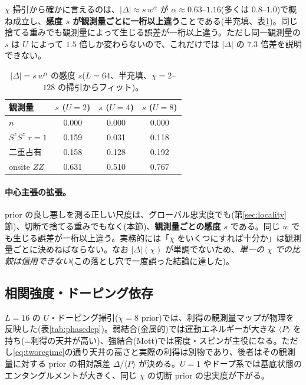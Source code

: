 \documentclass[11pt,a4paper]{ltjsarticle}
\newcommand{\ev}[1]{\langle #1\rangle}
\begin{document}
$\chi$ 掃引から確かに言えるのは、$|\Delta|\approx s\,w^{\alpha}$ が $\alpha\approx0.63$--$1.16$(多くは $0.8$--$1.0$)で概ね成立し、\textbf{感度 $s$ が観測量ごとに一桁以上違う}ことである(半充填、表\ref{tab:sensitivity})。同じ捨てる重みでも観測量によって生じる誤差が一桁以上違う。ただし同一観測量の $s$ は $U$ によって $1.5$ 倍しか変わらないので、これだけでは $|\Delta|$ の $7.3$ 倍差を説明できない。

\begin{table}[t]
\centering\small
\caption{$|\Delta|=s\,w^\alpha$ の感度 $s$($L=64$、半充填、$\chi=2$--$128$ の掃引からフィット)。}
\label{tab:sensitivity}
\begin{tabular}{@{}lccc@{}}
\toprule
観測量 & $s$ ($U{=}2$) & $s$ ($U{=}4$) & $s$ ($U{=}8$) \\
\midrule
$n$              & 0.000 & 0.000 & 0.000 \\
$S^zS^z$ $r{=}1$ & 0.159 & 0.031 & 0.118 \\
二重占有          & 0.158 & 0.128 & 0.192 \\
onsite $ZZ$      & 0.631 & 0.510 & 0.767 \\
\bottomrule
\end{tabular}
\end{table}

\paragraph{中心主張の拡張。}prior の良し悪しを測る正しい尺度は、グローバル忠実度でも(第\ref{sec:locality}節)、切断で捨てる重みでもなく(本節)、\textbf{観測量ごとの感度 $s$} である。同じ $w$ でも生じる誤差が一桁以上違う。実務的には「$\chi$ をいくつにすれば十分か」は観測量ごとに決めねばならない。なお $|\Delta|(\chi)$ が単調でないため、\emph{単一の $\chi$ での比較は信用できない}(この落とし穴で一度誤った結論に達した)。

\subsection{相関強度・ドーピング依存}
$L=16$ の $U$・ドーピング掃引($\chi{=}8$ prior)では、利得の観測量マップが物理を反映した(表\ref{tab:phasedep})。弱結合(金属的)では運動エネルギーが大きな $\ev{P}$ を持ち(=利得の天井が高い)、強結合(Mott)では密度・スピンが主役になる。ただし\eqref{eq:tworegime}の通り天井の高さと実際の利得は別物であり、後者はその観測量に対する prior の相対誤差 $\Delta/\ev{P}$ が決める。$U=1$ やドープ系では基底状態のエンタングルメントが大きく、同じ $\chi$ の切断 prior の忠実度が下がる。
\end{document}

